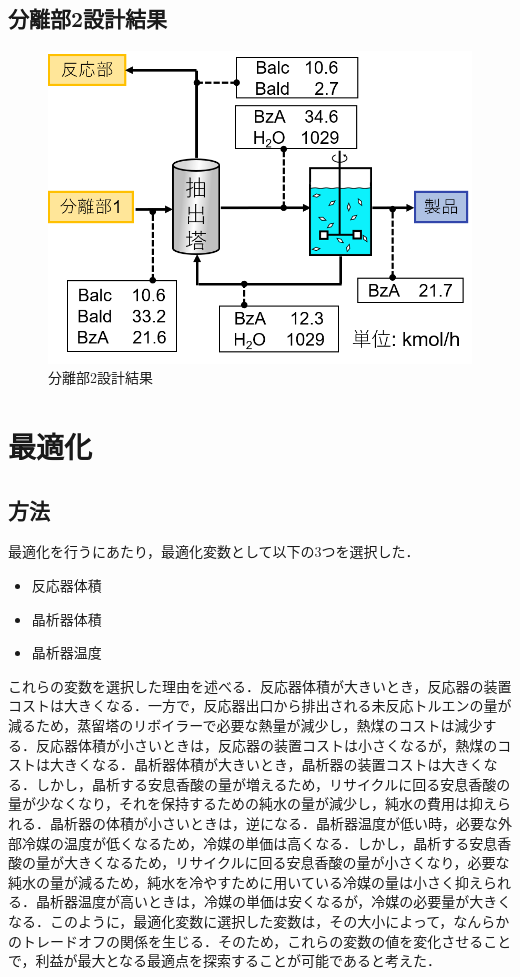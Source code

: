 \documentclass[a4j]{jsreport}
\begin{document}
\section{分離部2設計結果}
\begin{figure}[htbp]
    \label{分離部2設計結果}
    \begin{center}
        \includegraphics[scale=0.7]{Separion2Conclusion.png}
        \caption{分離部2設計結果}
    \end{center}
\end{figure}

\newpage
\chapter{最適化}
\section{方法}
最適化を行うにあたり，最適化変数として以下の3つを選択した．
\begin{itemize}
  \item 反応器体積
  \item 晶析器体積
  \item 晶析器温度
\end{itemize}

これらの変数を選択した理由を述べる．反応器体積が大きいとき，反応器の装置コストは大きくなる．一方で，反応器出口から排出される未反応トルエンの量が減るため，蒸留塔のリボイラーで必要な熱量が減少し，熱煤のコストは減少する．反応器体積が小さいときは，反応器の装置コストは小さくなるが，熱煤のコストは大きくなる．晶析器体積が大きいとき，晶析器の装置コストは大きくなる．しかし，晶析する安息香酸の量が増えるため，リサイクルに回る安息香酸の量が少なくなり，それを保持するための純水の量が減少し，純水の費用は抑えられる．晶析器の体積が小さいときは，逆になる．晶析器温度が低い時，必要な外部冷媒の温度が低くなるため，冷媒の単価は高くなる．しかし，晶析する安息香酸の量が大きくなるため，リサイクルに回る安息香酸の量が小さくなり，必要な純水の量が減るため，純水を冷やすために用いている冷媒の量は小さく抑えられる．晶析器温度が高いときは，冷媒の単価は安くなるが，冷媒の必要量が大きくなる．このように，最適化変数に選択した変数は，その大小によって，なんらかのトレードオフの関係を生じる．そのため，これらの変数の値を変化させることで，利益が最大となる最適点を探索することが可能であると考えた．
\end{document}
